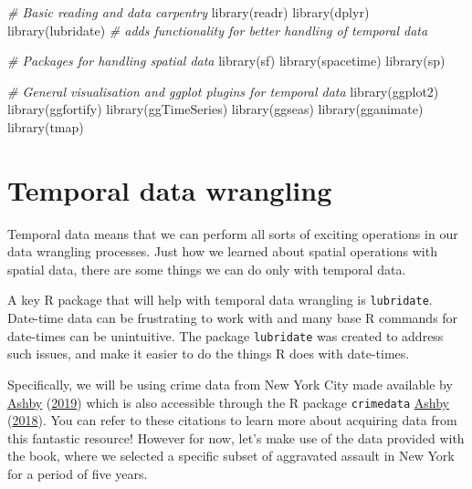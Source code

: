 \documentclass[
]{book}
\newenvironment{Shaded}{\begin{snugshade}}{\end{snugshade}}
\newcommand{\CommentTok}[1]{\textcolor[rgb]{0.56,0.35,0.01}{\textit{#1}}}
\newcommand{\FunctionTok}[1]{\textcolor[rgb]{0.00,0.00,0.00}{#1}}
\newcommand{\NormalTok}[1]{#1}
\begin{document}
\begin{Shaded}
\begin{Highlighting}[]
\CommentTok{\# Basic reading and data carpentry}
\FunctionTok{library}\NormalTok{(readr)}
\FunctionTok{library}\NormalTok{(dplyr)}
\FunctionTok{library}\NormalTok{(lubridate) }\CommentTok{\# adds functionality for better handling of temporal data}

\CommentTok{\# Packages for handling spatial data}
\FunctionTok{library}\NormalTok{(sf)}
\FunctionTok{library}\NormalTok{(spacetime)}
\FunctionTok{library}\NormalTok{(sp)}

\CommentTok{\# General visualisation and ggplot plugins for temporal data}
\FunctionTok{library}\NormalTok{(ggplot2)}
\FunctionTok{library}\NormalTok{(ggfortify)}
\FunctionTok{library}\NormalTok{(ggTimeSeries)}
\FunctionTok{library}\NormalTok{(ggseas)}
\FunctionTok{library}\NormalTok{(gganimate)}
\FunctionTok{library}\NormalTok{(tmap)}
\end{Highlighting}
\end{Shaded}

\hypertarget{temporal-data-wrangling}{%
\section{Temporal data wrangling}\label{temporal-data-wrangling}}

Temporal data means that we can perform all sorts of exciting operations in our data wrangling processes. Just how we learned about spatial operations with spatial data, there are some things we can do only with temporal data.

A key R package that will help with temporal data wrangling is \texttt{lubridate}. Date-time data can be frustrating to work with and many base R commands for date-times can be unintuitive. The package \texttt{lubridate} was created to address such issues, and make it easier to do the things R does with date-times.

Specifically, we will be using crime data from New York City made available by \protect\hyperlink{ref-Ashby_2019}{Ashby} (\protect\hyperlink{ref-Ashby_2019}{2019}) which is also accessible through the R package \texttt{crimedata} \protect\hyperlink{ref-Ashby_2018}{Ashby} (\protect\hyperlink{ref-Ashby_2018}{2018}). You can refer to these citations to learn more about acquiring data from this fantastic resource! However for now, let's make use of the data provided with the book, where we selected a specific subset of aggravated assault in New York for a period of five years.
\end{document}
